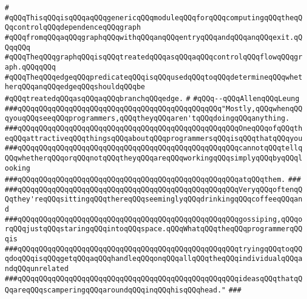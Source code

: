 \label{src/lib/compiler/back/low/ir-archive/cdg.pkg}
\verb|#|\newline
\verb|#qQQqThisqQQqisqQQqaqQQqgenericqQQqmoduleqQQqforqQQqcomputingqQQqtheqQQqcontrolqQQqdependenceqQQqgraph|\newline
\verb|#qQQqfromqQQqaqQQqgraphqQQqwithqQQqanqQQqentryqQQqandqQQqanqQQqexit.qQQqqQQq|\newline
\verb|#qQQqTheqQQqgraphqQQqisqQQqtreatedqQQqasqQQqaqQQqcontrolqQQqflowqQQqgraph.qQQqqQQq|\newline
\verb|#qQQqTheqQQqedgeqQQqpredicateqQQqisqQQqusedqQQqtoqQQqdetermineqQQqwhetherqQQqanqQQqedgeqQQqshouldqQQqbe|\newline
\verb|#qQQqtreatedqQQqasqQQqaqQQqbranchqQQqedge.|\newline
\verb|#|\newline
\verb|#qQQq--qQQqAllenqQQqLeung|\newline
\newline
\newline
\verb|###qQQqqQQqqQQqqQQqqQQqqQQqqQQqqQQqqQQqqQQqqQQqqQQq"Mostly,qQQqwhenqQQqyouqQQqseeqQQqprogrammers,qQQqtheyqQQqaren'tqQQqdoingqQQqanything.|\newline
\verb|###qQQqqQQqqQQqqQQqqQQqqQQqqQQqqQQqqQQqqQQqqQQqqQQqqQQqOneqQQqofqQQqtheqQQqattractiveqQQqthingsqQQqaboutqQQqprogrammersqQQqisqQQqthatqQQqyou|\newline
\verb|###qQQqqQQqqQQqqQQqqQQqqQQqqQQqqQQqqQQqqQQqqQQqqQQqqQQqcannotqQQqtellqQQqwhetherqQQqorqQQqnotqQQqtheyqQQqareqQQqworkingqQQqsimplyqQQqbyqQQqlooking|\newline
\verb|###qQQqqQQqqQQqqQQqqQQqqQQqqQQqqQQqqQQqqQQqqQQqqQQqqQQqatqQQqthem.|\newline
\verb|###|\newline
\verb|###qQQqqQQqqQQqqQQqqQQqqQQqqQQqqQQqqQQqqQQqqQQqqQQqqQQqVeryqQQqoftenqQQqthey'reqQQqsittingqQQqthereqQQqseeminglyqQQqdrinkingqQQqcoffeeqQQqand|\newline
\verb|###qQQqqQQqqQQqqQQqqQQqqQQqqQQqqQQqqQQqqQQqqQQqqQQqqQQqgossiping,qQQqorqQQqjustqQQqstaringqQQqintoqQQqspace.qQQqWhatqQQqtheqQQqprogrammerqQQqis|\newline
\verb|###qQQqqQQqqQQqqQQqqQQqqQQqqQQqqQQqqQQqqQQqqQQqqQQqqQQqtryingqQQqtoqQQqdoqQQqisqQQqgetqQQqaqQQqhandleqQQqonqQQqallqQQqtheqQQqindividualqQQqandqQQqunrelated|\newline
\verb|###qQQqqQQqqQQqqQQqqQQqqQQqqQQqqQQqqQQqqQQqqQQqqQQqqQQqideasqQQqthatqQQqareqQQqscamperingqQQqaroundqQQqinqQQqhisqQQqhead."|\newline
\verb|###|\newline

